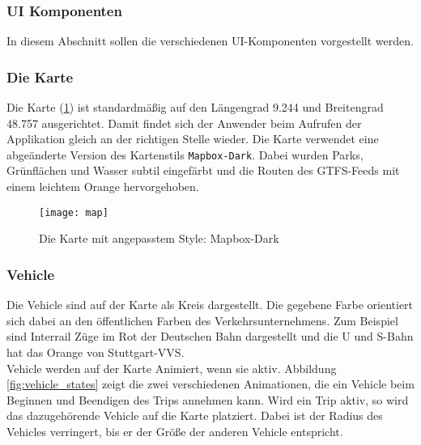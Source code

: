 
  \subsubsection{UI Komponenten}
  \label{ssub:ui_komponenten}

    In diesem Abschnitt sollen die verschiedenen UI-Komponenten vorgestellt werden.

    \subsubsection*{Die Karte}
    \label{ssub:die_karte}
      Die Karte (\ref{fig:map}) ist standardmäßig auf den Längengrad 9.244 und Breitengrad 48.757 ausgerichtet. Damit findet sich der Anwender beim Aufrufen der Applikation gleich an der richtigen Stelle wieder. Die Karte verwendet eine abgeänderte Version des Kartenstils \texttt{Mapbox-Dark}. Dabei wurden Parks, Grünflächen und Wasser subtil eingefärbt und die Routen des GTFS-Feeds mit einem leichtem Orange hervorgehoben.

      \begin{figure}[htbp]
        \begin{center}
          \texttt{[image: map]}
          \caption{Die Karte mit angepasstem Style: Mapbox-Dark}
          \label{fig:map}
        \end{center}
      \end{figure}
      

    \subsubsection*{Vehicle}
    \label{ssub:vehicle_auf_karte}
      Die Vehicle sind auf der Karte als Kreis dargestellt. Die gegebene Farbe orientiert sich dabei an den öffentlichen Farben des Verkehrsunternehmens. Zum Beispiel sind Interrail Züge im Rot der Deutschen Bahn dargestellt und die U und S-Bahn hat das Orange von Stuttgart-VVS.\\

      Vehicle werden auf der Karte Animiert, wenn sie aktiv. Abbildung \ref{fig:vehicle_states} zeigt die zwei verschiedenen Animationen, die ein Vehicle beim Beginnen und Beendigen des Trips annehmen kann. Wird ein Trip aktiv, so wird das dazugehörende Vehicle auf die Karte platziert. Dabei ist der Radius des Vehicles verringert, bis er der Größe der anderen Vehicle entspricht.

